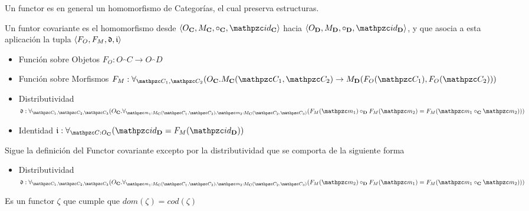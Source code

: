 \begin{defn}[Functor]
Un functor es en general un homomorfismo de Categorías, el cual preserva estructuras.
\end{defn}

\begin{defn}
\end{defn}
Un funtor covariante es el homomorfismo desde $\langle O_\cat{C}, M_\cat{C}, \circ_\cat{C}, \id_\cat{C} \rangle$ hacia $\langle O_\cat{D}, M_\cat{D}, \circ_\cat{D}, \id_\cat{D} \rangle$, y que asocia a esta aplicación la tupla $\langle F_O, F_M, \mathfrak{d}, \mathfrak{i} \rangle$  
\begin{itemize}
\item Función sobre Objetos $F_O : O_\cat{C} \to O_\cat{D}$
\item Función sobre Morfismos $F_M : 
\forall_{\ob{C}_1, \ob{C}_2}(O_\cat{C}. M_\cat{C}(\ob{C}_1, \ob{C}_2) \to M_\cat{D}(F_O(\ob{C}_1), F_O(\ob{C}_2)))$
\item Distributividad \\
$\mft{d}: 
\forall_{\ob{C}_1, \ob{C}_2, \ob{C}_3} 
( O_\cat{C} . \forall_{ \mo{m}_1 : M_\cat{C}(\ob{C}_1, \ob{C}_2), \mo{m}_2 : M_\cat{C}(\ob{C}_2, \ob{C}_3)} ( F_M(\mo{m}_1) \circ_\cat{D} F_M(\mo{m}_2) = F_M(\mo{m}_1 \circ_\cat{C} \mo{m}_2)))$
\item Identidad $\mft{i} : \forall_{ \ob{C} : O_\cat{C}}( \id_\cat{D} = F_M(\id_\cat{D}))$
\end{itemize}

\begin{defn}
Sigue la definición del Functor covariante excepto por la distributividad que se comporta de la siguiente forma
\end{defn}
\begin{itemize}
\item Distributividad \\
$\mft{d}: 
\forall_{\ob{C}_1, \ob{C}_2, \ob{C}_3} 
( O_\cat{C} . \forall_{ \mo{m}_1 : M_\cat{C}(\ob{C}_1, \ob{C}_2), \mo{m}_2 : M_\cat{C}(\ob{C}_2, \ob{C}_3)} ( F_M(\mo{m}_2) \circ_\cat{D} F_M(\mo{m}_1) = F_M(\mo{m}_1 \circ_\cat{C} \mo{m}_2)))$
\end{itemize}

\begin{defn}[Endofunctor]
\end{defn}
Es un functor $\zeta$ que cumple que $dom(\zeta)=cod(\zeta)$

